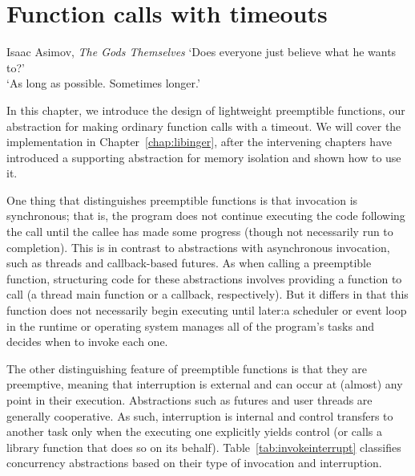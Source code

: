 \chapter{Function calls with timeouts}
\label{chap:functions}

\ifdefined\chapquotes
\begin{chapquote}{Isaac Asimov, \textit{The Gods Themselves}}
`Does everyone just believe what he wants to?' \\
`As long as possible.  Sometimes longer.'
\end{chapquote}
\fi

In this chapter, we introduce the design of lightweight preemptible functions, our
abstraction for making ordinary function calls with a timeout.  We will cover the
implementation in Chapter~\ref{chap:libinger}, after the intervening chapters have
introduced a supporting abstraction for memory isolation and shown how to use it.

One thing that distinguishes preemptible functions is that invocation is synchronous;
that is, the program does not continue executing the code following the call until
the callee has made some progress (though not necessarily run to completion).  This
is in contrast to abstractions with asynchronous invocation, such as threads and
callback-based futures.  As when calling a preemptible function, structuring code for
these abstractions involves providing a function to call (a thread main function or a
callback, respectively).  But it differs in that this function does not necessarily
begin executing until later:\@ a scheduler or event loop in the runtime or operating
system manages all of the program's tasks and decides when to invoke each one.

The other distinguishing feature of preemptible functions is that they are
preemptive, meaning that interruption is external and can occur at (almost) any point
in their execution.  Abstractions such as futures and user threads are generally
cooperative.  As such, interruption is internal and control transfers to another task
only when the executing one explicitly yields control (or calls a library function
that does so on its behalf).  Table~\ref{tab:invokeinterrupt} classifies concurrency
abstractions based on their type of invocation and interruption.


